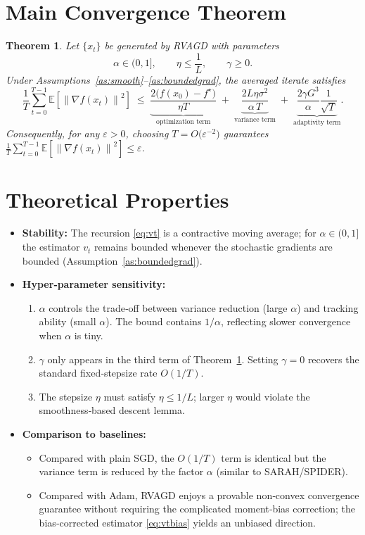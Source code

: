 \documentclass{article}
\newtheorem{theorem}{Theorem}
\newcommand{\E}{\mathbb{E}}
\newcommand{\norm}[1]{\left\|#1\right\|}
\begin{document}
\section*{Main Convergence Theorem}
\begin{theorem}\label{thm:main}
Let $\{x_{t}\}$ be generated by RVAGD with parameters
\[
\alpha\in(0,1],\qquad \eta\le\frac{1}{L},\qquad \gamma\ge0.
\]
Under Assumptions~\ref{as:smooth}–\ref{as:boundedgrad}, the averaged iterate satisfies
\[
\frac{1}{T}\sum_{t=0}^{T-1}\E\!\left[\norm{\nabla f(x_{t})}^{2}\right]
\;\le\;
\underbrace{\frac{2\bigl(f(x_{0})-f^{\star}\bigr)}{\eta T}}_{\text{optimization term}}
\;+\;
\underbrace{\frac{2L\eta\sigma^{2}}{\alpha\,T}}_{\text{variance term}}
\;+\;
\underbrace{ \frac{2\gamma G^{3}}{\alpha}\frac{1}{\sqrt{T}}}_{\text{adaptivity term}} .
\]
Consequently, for any $\varepsilon>0$, choosing $T=O\!\bigl(\varepsilon^{-2}\bigr)$ guarantees 
$\frac{1}{T}\sum_{t=0}^{T-1}\E\!\left[\norm{\nabla f(x_{t})}^{2}\right]\le\varepsilon$.
\end{theorem}

\section*{Theoretical Properties}
\begin{itemize}[leftmargin=*]
\item \textbf{Stability:} The recursion \eqref{eq:vt} is a contractive moving average; for $\alpha\in(0,1]$ the estimator $v_{t}$ remains bounded whenever the stochastic gradients are bounded (Assumption~\ref{as:boundedgrad}).  

\item \textbf{Hyper‑parameter sensitivity:}
\begin{enumerate}
\item $\alpha$ controls the trade‑off between variance reduction (large $\alpha$) and tracking ability (small $\alpha$). The bound contains $1/\alpha$, reflecting slower convergence when $\alpha$ is tiny.
\item $\gamma$ only appears in the third term of Theorem~\ref{thm:main}. Setting $\gamma=0$ recovers the standard fixed‑stepsize rate $O(1/T)$.
\item The stepsize $\eta$ must satisfy $\eta\le 1/L$; larger $\eta$ would violate the smoothness‑based descent lemma.
\end{enumerate}
\item \textbf{Comparison to baselines:}
\begin{itemize}
\item Compared with plain SGD, the $O(1/T)$ term is identical but the variance term is reduced by the factor $\alpha$ (similar to SARAH/SPIDER).
\item Compared with Adam, RVAGD enjoys a provable non‑convex convergence guarantee without requiring the complicated moment‑bias correction; the bias‑corrected estimator \eqref{eq:vtbias} yields an unbiased direction.
\end{itemize}
\end{itemize}
\end{document}
